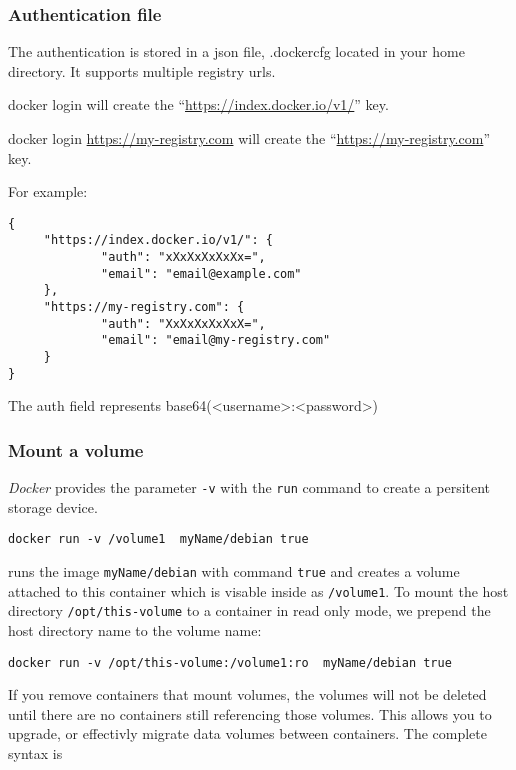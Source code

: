 \documentclass[11pt]{article}
\begin{document}
\subsubsection{Authentication file}
\label{sec-2-3-13}


The authentication is stored in a json file, .dockercfg located in your home directory. It supports multiple registry urls.

docker login will create the “\href{https://index.docker.io/v1/}{https://index.docker.io/v1/}” key.

docker login \href{https://my-registry.com}{https://my-registry.com} will create the “\href{https://my-registry.com}{https://my-registry.com}” key.

For example:

\begin{verbatim}
{
     "https://index.docker.io/v1/": {
             "auth": "xXxXxXxXxXx=",
             "email": "email@example.com"
     },
     "https://my-registry.com": {
             "auth": "XxXxXxXxXxX=",
             "email": "email@my-registry.com"
     }
}
\end{verbatim}
The auth field represents base64(<username>:<password>)
\subsubsection{Mount a volume}
\label{sec-2-3-14}

\emph{Docker} provides the parameter \texttt{-v} with the \texttt{run} command to create a persitent storage device. 

\begin{verbatim}
docker run -v /volume1  myName/debian true
\end{verbatim}
runs the image \texttt{myName/debian} with command \texttt{true} and creates a volume  attached to this container which is visable inside as \texttt{/volume1}. 
To mount the host directory \texttt{/opt/this-volume} to a container in read only mode, we prepend the host directory name to the volume name: 

\begin{verbatim}
docker run -v /opt/this-volume:/volume1:ro  myName/debian true
\end{verbatim}
If you remove containers that mount volumes, the volumes will not be deleted until there are no containers still referencing those volumes. This allows you to upgrade, or effectivly migrate data volumes between containers.
The complete syntax is
\end{document}
